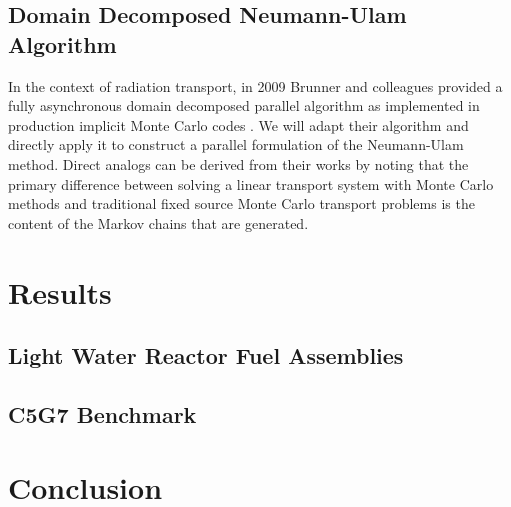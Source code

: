 \documentclass[letterpaper,11pt]{article}
\begin{document}
\subsection{Domain Decomposed Neumann-Ulam Algorithm}
\label{subsec:asynchronous_algorithm}
In the context of radiation transport, in 2009 Brunner and colleagues
provided a fully asynchronous domain decomposed parallel algorithm as
implemented in production implicit Monte Carlo codes
\cite{brunner_efficient_2009}. We will adapt their algorithm and
directly apply it to construct a parallel formulation of the
Neumann-Ulam method. Direct analogs can be derived from their works by
noting that the primary difference between solving a linear transport
system with Monte Carlo methods and traditional fixed source Monte
Carlo transport problems is the content of the Markov chains that are
generated.

\section{Results}

\subsection{Light Water Reactor Fuel Assemblies}

\subsection{C5G7 Benchmark}

\section{Conclusion}
\label{sec:conclusion}
\end{document}
